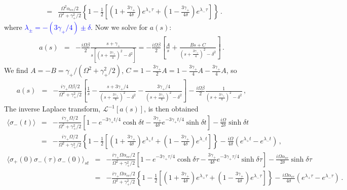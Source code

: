 \documentclass[twocolumn,aps,eqsecnum,showkeys,amsmath]{revtex4-2}
\begin{document}
\begin{widetext}
\begin{eqnarray}
&=& \frac{\Omega^2 \alpha_{ee}/2}{\Omega^2 +\gamma_+^2/2} \left\{ 1 
	-\frac{1}{2} \left[ \left( 1+\frac{3 \gamma_+}{4 \delta} \right) e^{\lambda_+ \tau}  	
	+ \left( 1-\frac{3 \gamma_+}{4 \delta} \right) e^{\lambda_- \tau} 
	 \right] \right\} 	\,.  
\end{eqnarray}
where \textcolor{blue}{$\lambda_{\pm} = -(3\gamma_+/4) \pm \delta$}. 
Now we solve for 
$a(s)$: 
%
\begin{eqnarray*} 	
a(s) &=& - \frac{i \Omega \beta}{2} 
	\frac{ s+\gamma_+}{s \left[ \left( s +\frac{3 \gamma_+}{4} \right)^2 
	- \delta^2  \right]} 	
	= - \frac{i \Omega \beta}{2} \left[ \frac{A}{s} 
	+\frac{Bs +C}{ \left( s +\frac{3 \gamma_+}{4} \right)^2 - \delta^2 } \right]  \,.
\end{eqnarray*}
We find $A =-B =\gamma_+/(\Omega^2 +\gamma_+^2/2)$, 
$C = 1 -\frac{3 \gamma_+}{2} A 
=1 -\frac{3 \gamma_+}{4} A -\frac{3 \gamma_+}{4} A  $, so 
%
\begin{eqnarray} 	
a(s) &=& - \frac{i \gamma_+ \Omega  \beta/2 }{\Omega^2 +\gamma_+^2/2} 
	\left[ \frac{1}{s} 
	-\frac{s+3\gamma_+/4}{ \left( s +\frac{3 \gamma_+}{4} \right)^2 - \delta^2 } 
	- \frac{3 \gamma_+/4}{ \left( s +\frac{3 \gamma_+}{4} \right)^2 - \delta^2 } 
	\right] 	-\frac{i \Omega \beta}{2} 
	\frac{1}{ \left( s +\frac{3 \gamma_+}{4} \right)^2 - \delta^2 }	\,, 
\end{eqnarray}
The inverse Laplace transform, $\mathcal{L}^{-1} [a(s)]$, is then obtained 
%
\begin{eqnarray} 	
\langle \sigma_{-} (t) \rangle 
&=&- \frac{i \gamma_+ \Omega/2 }{\Omega^2 +\gamma_+^2/2}
	\left[ 1 -e^{-3\gamma_+ t/4} \cosh{\delta t} 
	-\frac{3 \gamma_+}{4 \delta} e^{-3\gamma_+ t/4} \sinh{\delta t}  
	 \right] 	-\frac{i \Omega}{2 \delta} \sinh{\delta t} 	\nonumber \\  
&=& - \frac{i \gamma_+ \Omega/2 }{\Omega^2 +\gamma_+^2/2}  
	\left\{ 1 
	-\frac{1}{2} \left[ \left( 1+\frac{3 \gamma_+}{4 \delta} \right) e^{\lambda_+ t}  	
	+ \left( 1-\frac{3 \gamma_+}{4 \delta} \right) e^{\lambda_- t} 
	 \right] \right\} 
 -\frac{i \Omega}{4 \delta} \left( e^{\lambda_+ t} -e^{\lambda_- t} \right) \,,  
\end{eqnarray}
%
\begin{eqnarray} 	
\langle \sigma_+ (0) \sigma_{-} (\tau) \sigma_-(0) \rangle_{st} 
&=&- \frac{i \gamma_+ \Omega  \alpha_{ee}/2 }{\Omega^2 +\gamma_+^2/2}
	\left[ 1 -e^{-3\gamma_+ \tau/4} \cosh{\delta \tau} 
	-\frac{3 \gamma_+}{4 \delta} e^{-3\gamma_+ \tau/4} \sinh{\delta \tau}  
	 \right] 	-\frac{i \Omega \alpha_{ee}}{2 \delta} \sinh{\delta \tau}   
	 \nonumber \\  
&=& - \frac{i \gamma_+ \Omega  \alpha_{ee}/2 }{\Omega^2 +\gamma_+^2/2}  
	\left\{ 1 -\frac{1}{2} \left[ 
	\left( 1+\frac{3 \gamma_+}{4 \delta} \right) e^{\lambda_+ \tau}  	
	+ \left( 1-\frac{3 \gamma_+}{4 \delta} \right) e^{\lambda_- \tau} 
	 \right] \right\} 
	 -\frac{i \Omega \alpha_{ee}}{4 \delta} \left( e^{\lambda_+ \tau} 
	 -e^{\lambda_- \tau} \right) \,.	\nonumber \\   
\end{eqnarray}


\end{widetext}
\end{document}
